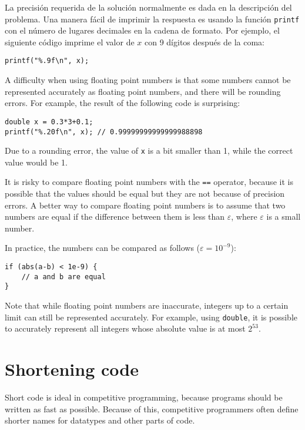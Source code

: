 La precisi\'on requerida de la soluci\'on
normalmente es dada en la descripci\'on del problema.
Una manera f\'acil de imprimir la respuesta
es usando la funci\'on \texttt{printf} con el n\'umero
de lugares decimales en la cadena de formato.
Por ejemplo, el siguiente c\'odigo imprime
el valor de $x$ con 9 d\'igitos despu\'es de la coma:

\begin{lstlisting}
printf("%.9f\n", x);
\end{lstlisting}

A difficulty when using floating point numbers
is that some numbers cannot be represented
accurately as floating point numbers,
and there will be rounding errors.
For example, the result of the following code
is surprising:

\begin{lstlisting}
double x = 0.3*3+0.1;
printf("%.20f\n", x); // 0.99999999999999988898
\end{lstlisting}

Due to a rounding error,
the value of \texttt{x} is a bit smaller than 1,
while the correct value would be 1.

It is risky to compare floating point numbers
with the \texttt{==} operator,
because it is possible that the values should be
equal but they are not because of precision errors.
A better way to compare floating point numbers
is to assume that two numbers are equal
if the difference between them is less than $\varepsilon$,
where $\varepsilon$ is a small number.

In practice, the numbers can be compared
as follows ($\varepsilon=10^{-9}$):

\begin{lstlisting}
if (abs(a-b) < 1e-9) {
    // a and b are equal
}
\end{lstlisting}

Note that while floating point numbers are inaccurate,
integers up to a certain limit can still be
represented accurately.
For example, using \texttt{double},
it is possible to accurately represent all
integers whose absolute value is at most $2^{53}$.

\section{Shortening code}

Short code is ideal in competitive programming,
because programs should be written
as fast as possible.
Because of this, competitive programmers often define
shorter names for datatypes and other parts of code.

